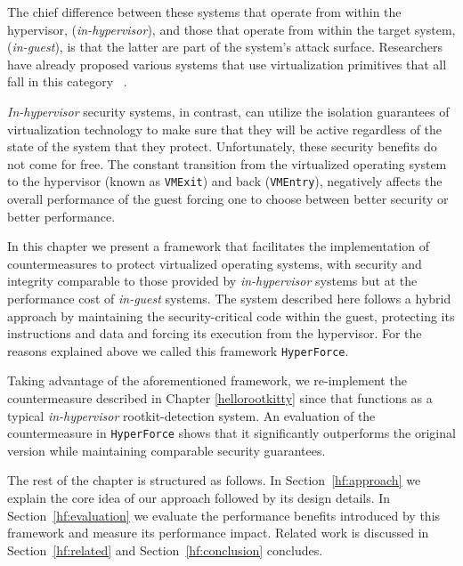 The chief difference between these systems that operate from within the hypervisor, (\textit{in-hypervisor}), and those that operate from within the target system, (\textit{in-guest}), is that the latter are part of the system's attack surface. Researchers have already proposed various systems that use virtualization primitives that all fall in this category ~\cite{Criswell2007, Dewant2008, copilot, NICKLE, qubesos}.

\textit{In-hypervisor} security systems, in contrast, can utilize the isolation guarantees of virtualization technology to make sure that they will be active regardless of the state of the system that they protect. 
Unfortunately, these security benefits do not come for free. The constant transition from the virtualized operating system to the hypervisor (known as \texttt{VMExit}) and back (\texttt{VMEntry}), negatively affects the overall performance of the guest forcing one to choose between better security or better performance.

In this chapter we present a framework that facilitates the implementation of countermeasures to protect virtualized operating systems, with security and integrity comparable to those provided by \textit{in-hypervisor} systems but at the performance cost of \textit{in-guest} systems. The system described here follows a hybrid approach by maintaining the security-critical code within the guest, protecting its instructions and data and forcing its execution from the hypervisor. For the reasons explained above we called this framework \texttt{HyperForce}.

Taking advantage of the aforementioned framework, we re-implement the countermeasure described in Chapter \ref{hellorootkitty} since that functions as a typical \textit{in-hypervisor} rootkit-detection system. An evaluation of the countermeasure in \texttt{HyperForce} shows that it significantly outperforms the original version while maintaining comparable security guarantees.

The rest of the chapter is structured as follows. In Section~\ref{hf:approach} we explain the core idea of our approach followed by its design details. In Section~\ref{hf:evaluation} we evaluate the performance benefits introduced by this framework and measure its performance impact. Related work is discussed in Section~\ref{hf:related} and Section~\ref{hf:conclusion} concludes.

